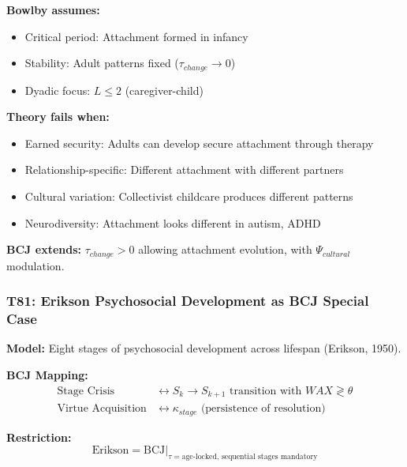\begin{tcolorbox}[colback=red!5!white, colframe=red!75!black,
    title=Boundary Condition: Where Bowlby Fails]
\textbf{Bowlby assumes:}
\begin{itemize}[nosep]
\item Critical period: Attachment formed in infancy
\item Stability: Adult patterns fixed ($\tau_{change} \to 0$)
\item Dyadic focus: $L \leq 2$ (caregiver-child)
\end{itemize}

\textbf{Theory fails when:}
\begin{itemize}[nosep]
\item Earned security: Adults can develop secure attachment through therapy
\item Relationship-specific: Different attachment with different partners
\item Cultural variation: Collectivist childcare produces different patterns
\item Neurodiversity: Attachment looks different in autism, ADHD
\end{itemize}

\textbf{BCJ extends:} $\tau_{change} > 0$ allowing attachment evolution, with $\Psi_{cultural}$ modulation.
\end{tcolorbox}

\subsubsection*{T81: Erikson Psychosocial Development as BCJ Special Case}

\textbf{Model:} Eight stages of psychosocial development across lifespan (Erikson, 1950).

\textbf{BCJ Mapping:}
\begin{align}
\text{Stage Crisis} &\leftrightarrow S_k \to S_{k+1} \text{ transition with } WAX \gtrless \theta \\
\text{Virtue Acquisition} &\leftrightarrow \kappa_{stage} \text{ (persistence of resolution)}
\end{align}

\textbf{Restriction:}
\begin{equation}
\text{Erikson} = \text{BCJ} \big|_{\tau = \text{age-locked}, \, \text{sequential stages mandatory}}
\end{equation}

